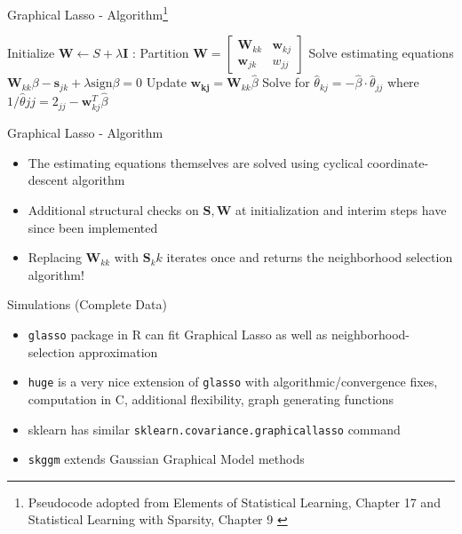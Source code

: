 \documentclass{beamer}
\begin{document}
\begin{frame}{Graphical Lasso - Algorithm\footnote{Pseudocode adopted from Elements of Statistical Learning, Chapter 17 \cite{hastie_elements_2009} and Statistical Learning with Sparsity, Chapter 9 \cite{hastie_statistical_2016}}}

\begin{algorithmic}[1]
    \State Initialize $\mathbf{W} \gets S + \lambda \mathbf{I}$
    :
    \State Partition $\mathbf{W} = \begin{bmatrix} \mathbf{W}_{kk} & \mathbf{w}_{kj} \\ \mathbf{w}_{jk} & w_{jj} \end{bmatrix}$
    \State Solve estimating equations $\mathbf{W}_{kk}\beta - \mathbf{s}_{jk} + \lambda \text{sign}\beta = 0$
    \State Update $\mathbf{w_{kj}} = \mathbf{W}_{kk}\hat\beta$
    \EndFor
    \State Solve for $\hat\theta_{kj} = -\hat\beta \cdot \hat\theta_{jj}$ where $1/\hat\theta{jj}=2_{jj}-\mathbf{w}_{kj}^T\hat\beta$
    \EndFor
\end{algorithmic}
\end{frame}

\begin{frame}{Graphical Lasso - Algorithm}
\begin{itemize}
    \item The estimating equations themselves are solved using cyclical coordinate-descent algorithm 
    \item Additional structural checks on $\mathbf{S,W}$ at initialization and interim steps have since been implemented
    \item Replacing $\mathbf{W}_{kk}$ with $\mathbf{S}_kk$ iterates once and returns the neighborhood selection algorithm! 
\end{itemize}
\end{frame}

\begin{frame}{Simulations (Complete Data)}
    \begin{itemize}
        \item \texttt{glasso} package in R can fit Graphical Lasso as well as neighborhood-selection approximation 
        \item \texttt{huge} is a very nice extension of \texttt{glasso} with algorithmic/convergence fixes, computation in C, additional flexibility, graph generating functions 
        \item sklearn has similar \texttt{sklearn.covariance.graphicallasso} command 
        \item \texttt{skggm} extends Gaussian Graphical Model methods  %
    \end{itemize}
\end{frame}
\end{document}
